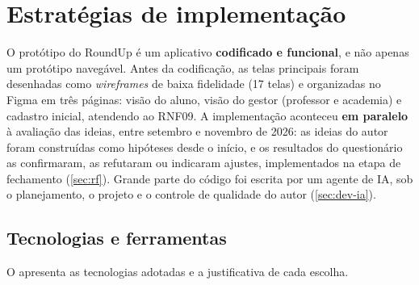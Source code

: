 
\chapter{Estratégias de implementação}
\label{cap:implementacao}

O protótipo do RoundUp é um aplicativo \textbf{codificado e funcional},
e não apenas um protótipo navegável. Antes da codificação, as telas
principais foram desenhadas como \textit{wireframes} de baixa fidelidade
(17 telas) e organizadas no Figma em três páginas: visão do aluno, visão
do gestor (professor e academia) e cadastro inicial, atendendo ao RNF09.
A implementação aconteceu \textbf{em paralelo} à avaliação das ideias,
entre setembro e novembro de 2026: as ideias do autor foram construídas
como hipóteses desde o início, e os resultados do questionário as
confirmaram, as refutaram ou indicaram ajustes, implementados na etapa de
fechamento (\autoref{sec:rf}). Grande parte do código foi escrita por um
agente de IA, sob o planejamento, o projeto e o controle de qualidade do
autor (\autoref{sec:dev-ia}).

\section{Tecnologias e ferramentas}

O  apresenta as tecnologias adotadas e a
justificativa de cada escolha.

